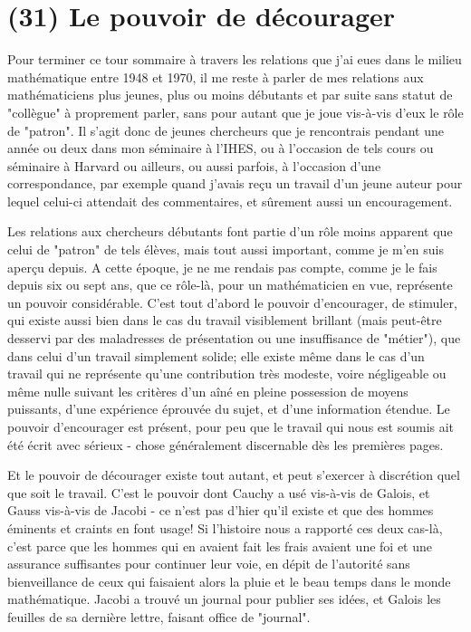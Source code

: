 \section{(31) Le pouvoir de décourager}

Pour terminer ce tour sommaire à travers les relations que j'ai eues dans le milieu mathématique entre 1948 et 1970, il me reste à parler de mes relations aux mathématiciens plus jeunes, plus ou moins débutants et par suite sans statut de "collègue" à proprement parler, sans pour autant que je joue vis-à-vis d'eux le rôle de "patron". Il s'agit donc de jeunes chercheurs que je rencontrais pendant une année ou deux dans mon séminaire à l'IHES, ou à l'occasion de tels cours ou séminaire à Harvard ou ailleurs, ou aussi parfois, à l'occasion d'une correspondance, par exemple quand j'avais reçu un travail d'un jeune auteur pour lequel celui-ci attendait des commentaires, et sûrement aussi un encouragement.

Les relations aux chercheurs débutants font partie d'un rôle moins apparent que celui de "patron" de tels élèves, mais tout aussi important, comme je m'en suis aperçu depuis. A cette époque, je ne me rendais pas compte, comme je le fais depuis six ou sept ans, que ce rôle-là, pour un mathématicien en vue, représente un pouvoir considérable. C'est tout d'abord le pouvoir d'encourager, de stimuler, qui existe aussi bien dans le cas du travail visiblement brillant (mais peut-être desservi par des maladresses de présentation ou une insuffisance de "métier"), que dans celui d'un travail simplement solide; elle existe même dans le cas d'un travail qui ne représente qu'une contribution très modeste, voire négligeable ou même nulle suivant les critères d'un aîné en pleine possession de moyens puissants, d'une expérience éprouvée du sujet, et d'une information étendue. Le pouvoir d'encourager est présent, pour peu que le travail qui nous est soumis ait été écrit avec sérieux - chose généralement discernable dès les premières pages.

Et le pouvoir de décourager existe tout autant, et peut s'exercer à discrétion quel que soit le travail. C'est le pouvoir dont Cauchy a usé vis-à-vis de Galois, et Gauss vis-à-vis de Jacobi - ce n'est pas d'hier qu'il existe et que des hommes éminents et craints en font usage! Si l'histoire nous a rapporté ces deux cas-là, c'est parce que les hommes qui en avaient fait les frais avaient une foi et une assurance suffisantes pour continuer leur voie, en dépit de l'autorité sans bienveillance de ceux qui faisaient alors la pluie et le beau temps dans le monde mathématique. Jacobi a trouvé un journal pour publier ses idées, et Galois les feuilles de sa dernière lettre, faisant office de "journal".

